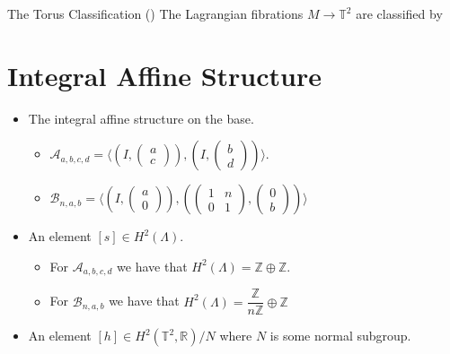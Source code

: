 \begin{frame}[c]{The Torus Classification (\cite{MISHACHEV1996301})}
	The Lagrangian fibrations $M \to \mathbb{T}^2$ are classified by
	\section*{Integral Affine Structure}
	\begin{itemize}
		\item The integral affine structure on the base.
		      \begin{itemize}
			      \item$\mathcal{A}_{a,b,c,d} = \bigg\langle(I, \begin{pmatrix}
						            a \\ c
					            \end{pmatrix}), (I, \begin{pmatrix}
					            b \\ d
				            \end{pmatrix})\bigg\rangle$.

			      \item $\mathcal{B}_{n,a,b} = \bigg\langle (I, \begin{pmatrix}
						            a \\ 0
					            \end{pmatrix}), (\begin{pmatrix}
					            1 & n \\ 0 & 1
				            \end{pmatrix}, \begin{pmatrix}
					            0 \\ b
				            \end{pmatrix}) \bigg\rangle$
		      \end{itemize}
		\item An element $[s] \in H^2(\Lambda)$.
		      \begin{itemize}
			      \item For $\mathcal{A}_{a,b,c,d}$ we have that $H^2(\Lambda) = \mathbb{Z}\oplus
				            \mathbb{Z}$.
			      \item For $\mathcal{B}_{n,a,b}$ we have that $H^2(\Lambda) =
				            \dfrac{\mathbb{Z}}{n\mathbb{Z}}\oplus \mathbb{Z}$
		      \end{itemize}
		\item An element $[h] \in H^2(\mathbb{T}^2, \mathbb{R})/N$ where $N$ is some normal
		      subgroup.
	\end{itemize}

\end{frame}

